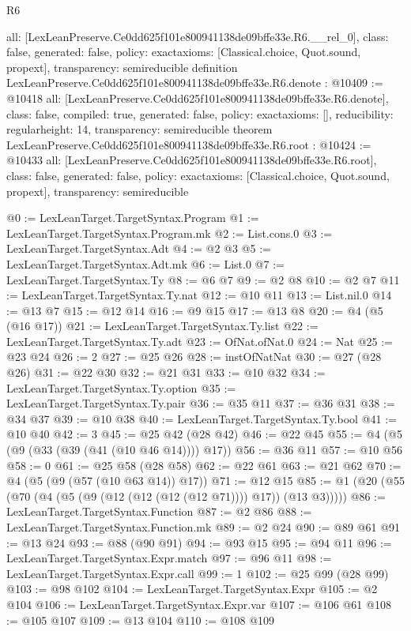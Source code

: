 \begin{lexlean}{R6}
\begin{coremodule}
{  all: [LexLeanPreserve.Ce0dd625f101e800941138de09bffe33e.R6.__rel_0],
  class: false,
  generated: false,
  policy: exact{axioms: [Classical.choice, Quot.sound, propext]},
  transparency: semireducible
}
definition LexLeanPreserve.Ce0dd625f101e800941138de09bffe33e.R6.denote : @10409 := @10418 {
  all: [LexLeanPreserve.Ce0dd625f101e800941138de09bffe33e.R6.denote],
  class: false,
  compiled: true,
  generated: false,
  policy: exact{axioms: []},
  reducibility: regular{height: 14},
  transparency: semireducible
}
theorem LexLeanPreserve.Ce0dd625f101e800941138de09bffe33e.R6.root : @10424 := @10433 {
  all: [LexLeanPreserve.Ce0dd625f101e800941138de09bffe33e.R6.root],
  class: false,
  generated: false,
  policy: exact{axioms: [Classical.choice, Quot.sound, propext]},
  transparency: semireducible
}

@0 := LexLeanTarget.TargetSyntax.Program
@1 := LexLeanTarget.TargetSyntax.Program.mk
@2 := List.cons.{0}
@3 := LexLeanTarget.TargetSyntax.Adt
@4 := @2 @3
@5 := LexLeanTarget.TargetSyntax.Adt.mk
@6 := List.{0}
@7 := LexLeanTarget.TargetSyntax.Ty
@8 := @6 @7
@9 := @2 @8
@10 := @2 @7
@11 := LexLeanTarget.TargetSyntax.Ty.nat
@12 := @10 @11
@13 := List.nil.{0}
@14 := @13 @7
@15 := @12 @14
@16 := @9 @15
@17 := @13 @8
@20 := @4 (@5 (@16 @17))
@21 := LexLeanTarget.TargetSyntax.Ty.list
@22 := LexLeanTarget.TargetSyntax.Ty.adt
@23 := OfNat.ofNat.{0}
@24 := Nat
@25 := @23 @24
@26 := 2
@27 := @25 @26
@28 := instOfNatNat
@30 := @27 (@28 @26)
@31 := @22 @30
@32 := @21 @31
@33 := @10 @32
@34 := LexLeanTarget.TargetSyntax.Ty.option
@35 := LexLeanTarget.TargetSyntax.Ty.pair
@36 := @35 @11
@37 := @36 @31
@38 := @34 @37
@39 := @10 @38
@40 := LexLeanTarget.TargetSyntax.Ty.bool
@41 := @10 @40
@42 := 3
@45 := @25 @42 (@28 @42)
@46 := @22 @45
@55 := @4 (@5 (@9 (@33 (@39 (@41 (@10 @46 @14)))) @17))
@56 := @36 @11
@57 := @10 @56
@58 := 0
@61 := @25 @58 (@28 @58)
@62 := @22 @61
@63 := @21 @62
@70 := @4 (@5 (@9 (@57 (@10 @63 @14)) @17))
@71 := @12 @15
@85 := @1 (@20 (@55 (@70 (@4 (@5 (@9 (@12 (@12 (@12 (@12 @71)))) @17)) (@13 @3)))))
@86 := LexLeanTarget.TargetSyntax.Function
@87 := @2 @86
@88 := LexLeanTarget.TargetSyntax.Function.mk
@89 := @2 @24
@90 := @89 @61
@91 := @13 @24
@93 := @88 (@90 @91)
@94 := @93 @15
@95 := @94 @11
@96 := LexLeanTarget.TargetSyntax.Expr.match
@97 := @96 @11
@98 := LexLeanTarget.TargetSyntax.Expr.call
@99 := 1
@102 := @25 @99 (@28 @99)
@103 := @98 @102
@104 := LexLeanTarget.TargetSyntax.Expr
@105 := @2 @104
@106 := LexLeanTarget.TargetSyntax.Expr.var
@107 := @106 @61
@108 := @105 @107
@109 := @13 @104
@110 := @108 @109

\end{coremodule}
\end{lexlean}
